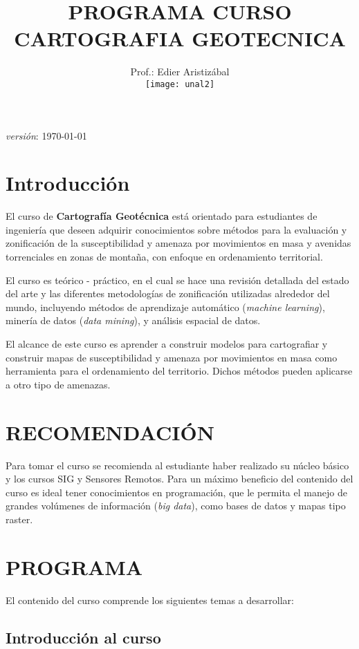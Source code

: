 \documentclass[twoside,11pt,]{article}
\title {PROGRAMA  CURSO\\ CARTOGRAFIA GEOTECNICA}
\author{Prof.: Edier Aristizábal\\[5ex]
\texttt{[image: unal2]}
}
\date{}
\begin{document}
\maketitle

\emph {versión}: \today

\section* {Introducción}
El curso de \textbf{Cartografía Geotécnica} está orientado para estudiantes de ingeniería que deseen adquirir conocimientos sobre métodos para la evaluación y zonificación de la susceptibilidad y amenaza por movimientos en masa y avenidas torrenciales en zonas de montaña, con enfoque en ordenamiento territorial.
\par El curso es teórico - práctico, en el cual se hace una revisión detallada del estado del arte y las diferentes metodologías de zonificación utilizadas alrededor del mundo, incluyendo métodos de aprendizaje automático (\emph{machine learning}), minería de datos (\emph{data mining}), y análisis espacial de datos.
\par El alcance de este curso es aprender a construir modelos para cartografiar y construir mapas de susceptibilidad y amenaza por movimientos en masa como herramienta para el ordenamiento del territorio. Dichos métodos pueden aplicarse a otro tipo de amenazas.

\section{RECOMENDACIÓN}
Para tomar el curso se recomienda al estudiante haber realizado su núcleo básico y los cursos SIG y Sensores Remotos. Para un máximo beneficio del contenido del curso es ideal tener conocimientos en programación, que le permita el manejo de grandes volúmenes de información (\emph{big data}), como bases de datos y mapas tipo raster.

\section{PROGRAMA}
El contenido del curso comprende los siguientes temas a desarrollar:\\

\subsection*{Introducción al curso}
\end{document}
